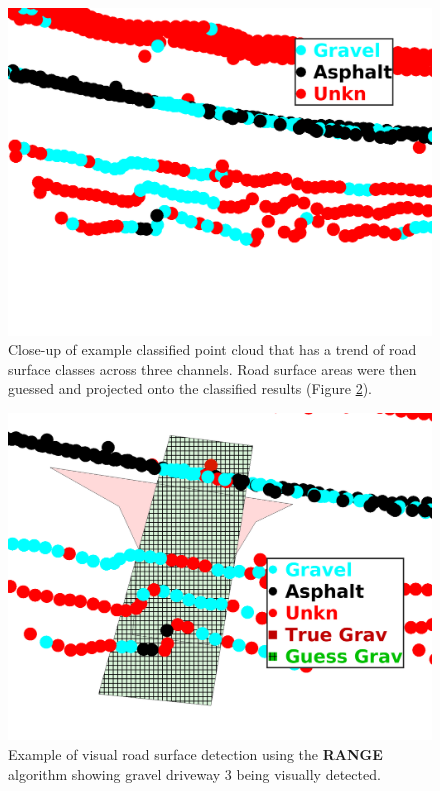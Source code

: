 \documentclass[numbered,pdftex]{ohio-etd}
\begin{document}
{{{		\begin{figure}[H]
			\centering
			\includegraphics[width=0.95\linewidth]{Defense_Images/pre_guess}
			\caption[Visual Scores: RANGE Source]{Close-up of example classified point cloud that has a trend of road surface classes across three channels. Road surface areas were then guessed and projected onto the classified results (Figure \ref{fig:range_example_vis_score}).}
			\label{fig:pre_guess}
		\end{figure}
		
		\begin{figure}[H]
			\centering
			\includegraphics[width=0.95\linewidth]{Defense_Images/range_db_6_overlap_2}
			\caption[Visual Scores: RANGE]{Example of visual road surface detection using the \textbf{RANGE} algorithm showing gravel driveway $3$ being visually detected.}
			\label{fig:range_example_vis_score}
		\end{figure}
		
}}}
\end{document}

